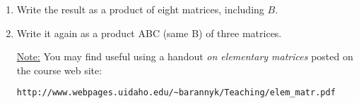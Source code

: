 \documentclass [12pt]{article}
\begin{document}
\begin{enumerate}
\begin{enumerate}

\item   Write the result as a product of eight matrices, including
$B$. 

\item   Write it again as a product ABC (same B) of three matrices. 

\noindent \hspace*{-20pt}\underline{Note:} You may find useful
using a handout {\it on elementary matrices} posted on the course
web site:

\begin{verbatim}
http://www.webpages.uidaho.edu/~barannyk/Teaching/elem_matr.pdf
\end{verbatim}

\end{enumerate}
\end{enumerate}
\end{document}
